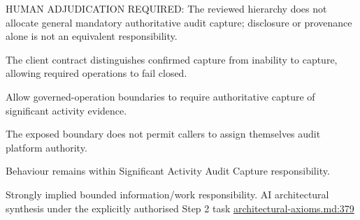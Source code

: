 HUMAN ADJUDICATION REQUIRED: The reviewed hierarchy does not allocate general mandatory authoritative audit capture; disclosure or provenance alone is not an equivalent responsibility.



The client contract distinguishes confirmed capture from inability to capture, allowing required operations to fail closed.



Allow governed-operation boundaries to require authoritative capture of significant activity evidence.



The exposed boundary does not permit callers to assign themselves audit platform authority.



Behaviour remains within Significant Activity Audit Capture responsibility.


Strongly implied bounded information/work responsibility. AI architectural synthesis under the explicitly authorised Step 2 task \hyperref[evidence:27549d51551beae6]{architectural-axioms.md:379}
